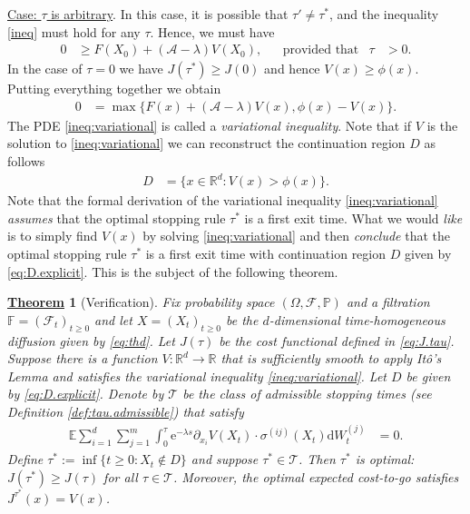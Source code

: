 \documentclass[12pt]{book}
\let\varphi\phi
\numberwithin{equation}{chapter}
\theoremstyle{plain}
\newtheorem{theorem}{\underline{Theorem}}
\numberwithin{theorem}{section}
\theoremstyle{definition}
\numberwithin{exercise}{chapter}
\newcommand{\<}{\langle}
\renewcommand{\>}{\rangle}
\renewcommand{\(}{\left(}
\renewcommand{\)}{\right)}
\renewcommand{\[}{\left[}
\renewcommand{\]}{\right]}
\newcommand\Eb{\mathds{E}}
\newcommand\Fb{\mathds{F}}
\newcommand\Pb{\mathds{P}}
\newcommand\Rb{\mathds{R}}
\newcommand\Ac{\mathscr{A}}
\newcommand\Fc{\mathscr{F}}
\newcommand\Tc{\mathscr{T}}
\newcommand\Om{\Omega}
\newcommand\sig{\sigma}
\newcommand\lam{\lambda}
\renewcommand\d{\partial}
\newcommand\dd{\mathrm{d}}
\newcommand\ee{\mathrm{e}}
\begin{document}
\underline{Case: $\tau$ is arbitrary}.  In this case, it is possible that $\tau' \neq \tau^*$, and the inequality \eqref{ineq} must hold for any $\tau$.  Hence, we must have
\begin{align}
0
	&\geq	F(X_0) + (\Ac - \lam ) V(X_0) , &
	&\text{provided that}&
\tau
	&> 0 .
\end{align}
In the case of $\tau = 0$ we have $J(\tau^*) \geq J(0)$ and hence $V(x) \geq \varphi(x)$.  Putting everything together we obtain
\begin{align}
0
	&=	\max\{ F(x) + (\Ac - \lam ) V(x) ,\varphi(x) - V(x) \} . \label{ineq:variational}
\end{align}
The PDE \eqref{ineq:variational} is called a \emph{variational inequality}.  Note that if $V$ is the solution to \eqref{ineq:variational} we can reconstruct the continuation region $D$ as follows
\begin{align}
D
	&=	\{ x \in \Rb^d : V(x) > \varphi(x) \} . \label{eq:D.explicit}
\end{align}
Note that the formal derivation of the variational inequality \eqref{ineq:variational} \emph{assumes} that the optimal stopping rule $\tau^*$ is a first exit time.  What we would \emph{like} is to simply find $V(x)$ by solving \eqref{ineq:variational} and then \emph{conclude} that the optimal stopping rule $\tau^*$ is a first exit time with continuation region $D$ given by \eqref{eq:D.explicit}.  This is the subject of the following theorem.

\begin{theorem}[Verification]
\label{thm:optimal.stopping}
Fix probability space $(\Om,\Fc,\Pb)$ and a filtration $\Fb = (\Fc_t)_{t \geq 0}$ and let $X = (X_t)_{t \geq 0}$ be the $d$-dimensional time-homogeneous diffusion given by \eqref{eq:thd}.
Let $J(\tau)$ be the cost functional defined in \eqref{eq:J.tau}.  Suppose there is a function $V : \Rb^d \to \Rb$ that is sufficiently smooth to apply It\^o's Lemma and satisfies the variational inequality \eqref{ineq:variational}.  Let $D$ be given by \eqref{eq:D.explicit}.  Denote by $\Tc$ be the class of admissible stopping times (see Definition \ref{def:tau.admissible}) that satisfy
\begin{align}
\Eb \sum_{i=1}^d \sum_{j=1}^m \int_0^\tau \ee^{-\lam s} \d_{x_i} V(X_t) \cdot \sig^{(ij)}(X_t) \dd W_t^{(j)} \label{eq:tau.condition}
	&=	0 .
\end{align}
Define $\tau^* := \inf\{ t \geq 0 : X_t \notin D \}$ and suppose $\tau^* \in \Tc$.  Then $\tau^*$ is optimal: $J(\tau^*) \geq J(\tau)$ for all $\tau \in \Tc$.  Moreover, the optimal expected cost-to-go satisfies $J^{\tau^*}(x) = V(x)$.
\end{theorem}
\end{document}
